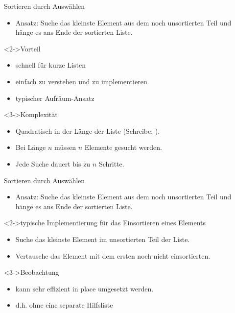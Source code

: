 \begin{frame}
    \begin{block}{Sortieren durch Auswählen}
        \begin{itemize}
            \item Ansatz: Suche das kleinste Element aus dem noch unsortierten Teil und hänge es ans Ende der sortierten Liste.
        \end{itemize}
    \end{block}
    \begin{block}<2->{Vorteil}
        \begin{itemize}
            \item schnell für kurze Listen
            \item einfach zu verstehen und zu implementieren.
            \item typischer Aufräum-Ansatz
        \end{itemize}
    \end{block}
    \begin{block}<3->{Komplexität}
        \begin{itemize}
            \item Quadratisch in der Länge der Liste  (Schreibe: \alert{\osquare}).
            \item Bei Länge $n$ müssen $n$ Elemente gesucht werden.
            \item Jede Suche dauert bis zu $n$ Schritte.
        \end{itemize}
    \end{block}
\end{frame}

\begin{frame}
    \begin{block}{Sortieren durch Auswählen}
        \begin{itemize}
            \item Ansatz: Suche das kleinste Element aus dem noch unsortierten Teil und hänge es ans Ende der sortierten Liste.
        \end{itemize}
    \end{block}
    \begin{block}<2->{typische Implementierung für das Einsortieren eines Elements}
        \begin{itemize}
            \item Suche das kleinste Element im unsortierten Teil der Liste.
            \item Vertausche das Element mit dem ersten noch nicht einsortierten.
        \end{itemize}
    \end{block}
    \begin{block}<3->{Beobachtung}
        \begin{itemize}
            \item kann sehr effizient \alert{in place} umgesetzt werden.
            \item d.h. ohne eine separate Hilfsliste
        \end{itemize}
    \end{block}
\end{frame}